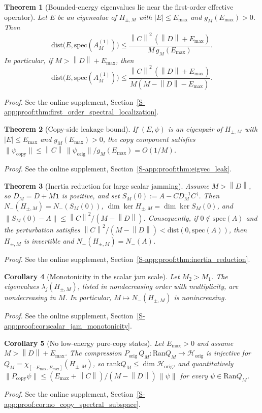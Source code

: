 \documentclass[11pt]{article}
\numberwithin{equation}{section}
\newtheorem{theorem}{Theorem}[section]
\newtheorem{corollary}[theorem]{Corollary}
\theoremstyle{definition}
\theoremstyle{remark}
\newcommand{\proofsuppref}[1]{%
  \par\noindent\emph{Proof.} See the online supplement, Section~\ref{S-#1}.\par\medskip
}
\newcommand{\Hil}{\mathcal{H}}
\newcommand{\Id}{\mathbf{1}}
\newcommand{\spec}{\mathrm{spec}}
\newcommand{\dist}{\mathrm{dist}}
\newcommand{\rank}{\mathrm{rank}}
\newcommand{\Ran}{\mathrm{Ran}}
\newcommand{\opnorm}[1]{\left\lVert#1\right\rVert}
\begin{document}
\begin{theorem}[Bounded-energy eigenvalues lie near the first-order effective operator]\label{thm:first_order_spectral_localization}
Let $E$ be an eigenvalue of $H_{\pm,M}$ with $|E|\le E_{\max}$ and $g_M(E_{\max})>0$. Then
\begin{equation}\label{eq:specA1_exact}
\dist\bigl(E,\spec(A_M^{(1)})\bigr)
\le
\frac{\opnorm{C}^2\,(\opnorm{D}+E_{\max})}{M\,g_M(E_{\max})}.
\end{equation}
In particular, if $M>\opnorm{D}+E_{\max}$, then
\begin{equation}\label{eq:specA1_crude}
\dist\bigl(E,\spec(A_M^{(1)})\bigr)
\le
\frac{\opnorm{C}^2\,(\opnorm{D}+E_{\max})}{M(M-\opnorm{D}-E_{\max})}.
\end{equation}
\end{theorem}
\proofsuppref{app:proof:thm:first_order_spectral_localization}

\begin{theorem}[Copy-side leakage bound]\label{thm:eigvec_leak}
If $(E,\psi)$ is an eigenpair of $H_{\pm,M}$ with $|E|\le E_{\max}$ and $g_M(E_{\max})>0$,
the copy component satisfies $\|\psi_{\mathrm{copy}}\|\le
\opnorm{C}\,\|\psi_{\mathrm{orig}}\|/g_M(E_{\max})=O(1/M)$.
\end{theorem}
\proofsuppref{app:proof:thm:eigvec_leak}

\begin{theorem}[Inertia reduction for large scalar jamming]\label{thm:inertia_reduction}
Assume $M>\opnorm{D}$, so $D_M=D+M\Id$ is positive, and set $S_M(0):=A-CD_M^{-1}C^\dagger$. Then
$N_-(H_{\pm,M})=N_-(S_M(0))$, $\dim\ker H_{\pm,M}=\dim\ker S_M(0)$, and
$\|S_M(0)-A\|\le\opnorm{C}^2/(M-\opnorm{D})$. Consequently, if $0\notin\spec(A)$ and the
perturbation satisfies $\opnorm{C}^2/(M-\opnorm{D})<\dist(0,\spec(A))$, then $H_{\pm,M}$ is
invertible and $N_-(H_{\pm,M})=N_-(A)$.
\end{theorem}
\proofsuppref{app:proof:thm:inertia_reduction}

\begin{corollary}[Monotonicity in the scalar jam scale]\label{cor:scalar_jam_monotonicity}
Let $M_2>M_1$. The eigenvalues $\lambda_j(H_{\pm,M})$, listed in nondecreasing order with
multiplicity, are nondecreasing in $M$. In particular, $M\mapsto N_-(H_{\pm,M})$ is nonincreasing.
\end{corollary}
\proofsuppref{app:proof:cor:scalar_jam_monotonicity}

\begin{corollary}[No low-energy pure-copy states]\label{cor:no_copy_spectral_subspace}
Let $E_{\max}>0$ and assume $M>\opnorm{D}+E_{\max}$. The compression
$P_{\mathrm{orig}}\,Q_M:\Ran Q_M\to\Hil_{\mathrm{orig}}$ is injective for
$Q_M=\chi_{[-E_{\max},E_{\max}]}(H_{\pm,M})$, so $\rank Q_M\le\dim\Hil_{\mathrm{orig}}$, and
quantitatively $\|P_{\mathrm{copy}}\psi\|\le (E_{\max}+\opnorm C)/(M-\opnorm D)\,\|\psi\|$ for
every $\psi\in\Ran Q_M$.
\end{corollary}
\proofsuppref{app:proof:cor:no_copy_spectral_subspace}
\end{document}
